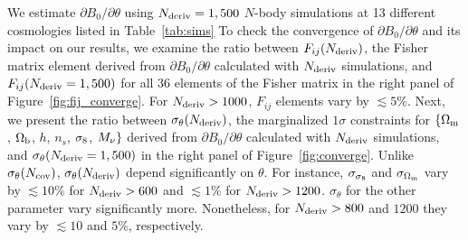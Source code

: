 We estimate $\partial B_0/\partial \theta$ using $N_{\rm deriv} = 1,500$ 
$N$-body simulations at 13 different cosmologies listed in Table~\ref{tab:sims} 
To check the convergence of $\partial B_0/\partial \theta$ and its impact on our 
results, we examine the ratio between $F_{ij}(N_{\rm deriv})$, the Fisher 
matrix element derived from $\partial B_0/\partial \theta$ calculated with 
$N_{\rm deriv}$ simulations, and $F_{ij}(N_{\rm deriv} = 1,500)$ for all 
36 elements of the Fisher matrix in the right panel of Figure~\ref{fig:fij_converge}.
For $N_{\rm deriv} > 1000$, $F_{ij}$ elements vary by $\lesssim 5\%$. Next, we
present the ratio between $\sigma_\theta(N_{\rm deriv})$, the marginalized 
$1\sigma$ constraints for $\{\Omega_{\rm m}$, $\Omega_{\rm b}$, $h$, $n_s$, $\sigma_8$, $M_\nu\}$ 
derived from $\partial B_0/\partial \theta$ calculated with $N_{\rm deriv}$ 
simulations, and $\sigma_\theta(N_{\rm deriv} = 1,500)$ in the right panel 
of Figure~\ref{fig:converge}. Unlike $\sigma_\theta(N_{\rm cov})$, 
$\sigma_\theta(N_{\rm deriv})$ depend significantly on $\theta$. For instance, 
$\sigma_{\sigma_8}$ and $\sigma_{\Omega_{\rm m}}$ vary by $\lesssim 10\%$ for $N_{\rm deriv} > 600$ 
and $\lesssim 1\%$ for $N_{\rm deriv} > 1200$. $\sigma_\theta$ for the other 
parameter vary significantly more. Nonetheless, for $N_{\rm deriv} > 800$ and 
$1200$ they vary by $\lesssim 10$ and $5\%$, respectively.

